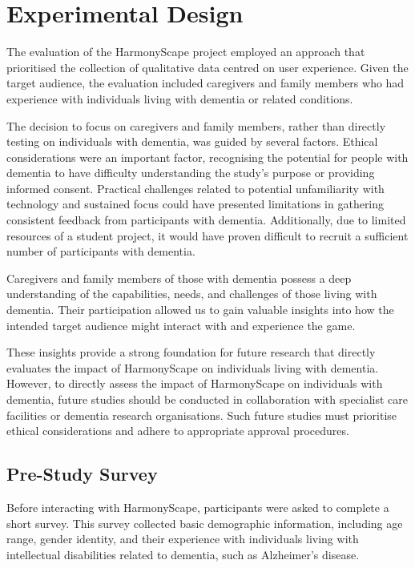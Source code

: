 \documentclass{l4proj}
\begin{document}
\section{Experimental Design}
The evaluation of the HarmonyScape project employed an approach that prioritised the collection of qualitative data centred on user experience. Given the target audience, the evaluation included caregivers and family members who had experience with individuals living with dementia or related conditions.

The decision to focus on caregivers and family members, rather than directly testing on individuals with dementia, was guided by several factors. Ethical considerations were an important factor, recognising the potential for people with dementia to have difficulty understanding the study's purpose or providing informed consent. Practical challenges related to potential unfamiliarity with technology and sustained focus could have presented limitations in gathering consistent feedback from participants with dementia. Additionally, due to limited resources of a student project, it would have proven difficult to recruit a sufficient number of participants with dementia.

Caregivers and family members of those with dementia possess a deep understanding of the capabilities, needs, and challenges of those living with dementia. Their participation allowed us to gain valuable insights into how the intended target audience might interact with and experience the game.

These insights provide a strong foundation for future research that directly evaluates the impact of HarmonyScape on individuals living with dementia. However, to directly assess the impact of HarmonyScape on individuals with dementia, future studies should be conducted in collaboration with specialist care facilities or dementia research organisations. Such future studies must prioritise ethical considerations and adhere to appropriate approval procedures.

\subsection{Pre-Study Survey}
Before interacting with HarmonyScape, participants were asked to complete a short survey. This survey collected basic demographic information, including age range, gender identity, and their experience with individuals living with intellectual disabilities related to dementia, such as Alzheimer's disease.
\end{document}
